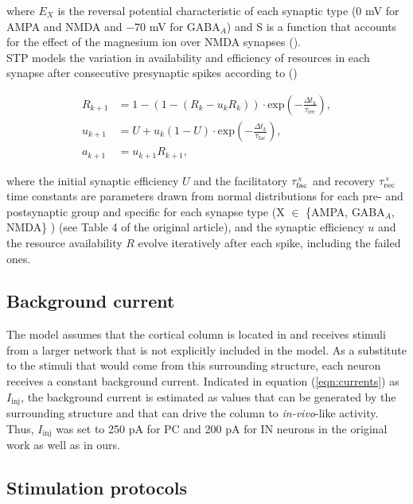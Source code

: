 where $E_X$ is the reversal potential characteristic of each synaptic type  (0 mV for AMPA and NMDA and $-70$ mV for GABA$_A$) and S is a function that accounts for the effect of the magnesium ion over NMDA synapses (\cite{jahr90vol}).\\

STP models the variation in availability and efficiency of resources in each synapse after consecutive presynaptic spikes according to (\cite{maas02syn})

\begin{subequations}
\begin{align}
R_{k+1} &= 1 - (1 - (R_{k} - u_{k}  R_{k})) \cdot \text{exp}\left(-\frac{\Delta t_{k}}{\tau_{\text{rec}}}\right),\\
u_{k+1} &= U + u_{k}(1 - U) \cdot \text{exp}\left(-\frac{\Delta t_{k}}{\tau_{\text{fac}}}\right),\\
a_{k+1} &= u_{k+1} R_{k+1} ,
\end{align}
\end{subequations}

where the initial synaptic efficiency $U$ and the facilitatory $\tau_{\text{fac}}^{\scaleto{X}{3pt}}$ and recovery $\tau_{\text{rec}}^{\scaleto{X}{3pt}}$ time constants are parameters drawn from normal distributions for each pre- and postsynaptic group and specific for each synapse type (X $\in$ \{AMPA, GABA$_A$, NMDA\} ) (see Table 4 of the original article), and the synaptic efficiency $u$ and the resource availability $R$ evolve iteratively after each spike, including the failed ones.

\subsection*{Background current}

The model assumes that the cortical column is located in and receives stimuli from a larger network that is not explicitly included in the model. As a substitute to the stimuli that would come from this surrounding structure, each neuron receives a constant background current. Indicated in equation (\ref{eqn:currents}) as $I_{\text{inj}}$, the background current is estimated as values that can be generated by the surrounding structure and that can drive the column to \textit{in-vivo}-like activity. Thus, $I_{\text{inj}}$ was set to 250 pA for PC and 200 pA for IN neurons in the original work as well as in ours.\\

\subsection*{Stimulation protocols}


